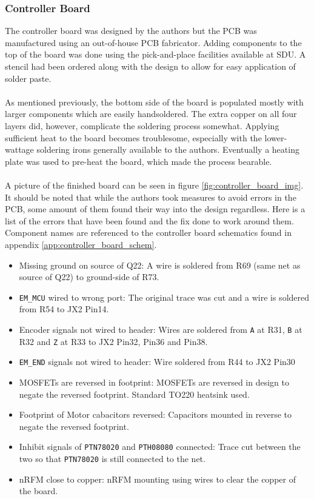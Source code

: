 \subsubsection{Controller Board} %
\label{ssub:controller_board}
The controller board was designed by the authors but the PCB was manufactured using an out-of-house PCB fabricator.
Adding components to the top of the board was done using the pick-and-place facilities available at SDU.
A stencil had been ordered along with the design to allow for easy application of solder paste.
\\~\\
As mentioned previously, the bottom side of the board is populated mostly with larger components which are easily handsoldered.
The extra copper on all four layers did, however, complicate the soldering process somewhat.
Applying sufficient heat to the board becomes troublesome, especially with the lower-wattage soldering irons generally available to the authors.
Eventually a heating plate was used to pre-heat the board, which made the process bearable.
\\~\\
A picture of the finished board can be seen in figure \ref{fig:controller_board_img}.
It should be noted that while the authors took measures to avoid errors in the PCB, some amount of them found their way into the design regardless.
Here is a list of the errors that have been found and the fix done to work around them.
Component names are referenced to the controller board schematics found in appendix \ref{app:controller_board_schem}.
\begin{itemize}
	\item Missing ground on source of Q22: A wire is soldered from R69 (same net as source of Q22) to ground-side of R73.
	\item \texttt{EM\_MCU} wired to wrong port: The original trace was cut and a wire is soldered from R54 to JX2 Pin14.
	\item Encoder signals not wired to header: Wires are soldered from \texttt{A} at R31, \texttt{B} at R32 and \texttt{Z} at R33 to JX2 Pin32, Pin36 and Pin38.
	\item \texttt{EM\_END} signals not wired to header: Wire soldered from R44 to JX2 Pin30
	\item MOSFETs are reversed in footprint: MOSFETs are reversed in design to negate the reversed footprint.
	Standard TO220 heatsink used.
	\item Footprint of Motor cabacitors reversed: Capacitors mounted in reverse to negate the reversed footprint.
	\item Inhibit signals of \texttt{PTN78020} and \texttt{PTH08080} connected: Trace cut between the two so that \texttt{PTN78020} is still connected to the net.
	\item nRFM close to copper: nRFM mounting using wires to clear the copper of the board.
\end{itemize}
